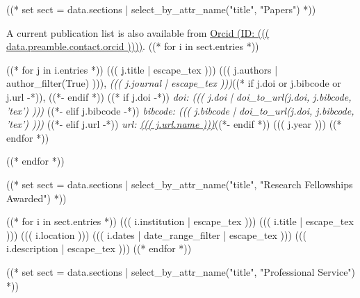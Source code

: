 \documentclass[10pt, letterpaper]{awesome-cv}
\begin{document}
((* set  sect = data.sections | select_by_attr_name("title", "Papers") *))

A current publication list is also available from 
\href{https://orcid.org/((( data.preamble.contact.orcid )))}
     {Orcid (ID: ((( data.preamble.contact.orcid ))))}.
((* for i in sect.entries *))
\begin{cvhonors}
  ((* for j in i.entries *))
  \cvhonor
    {((( j.title | escape_tex )))}
    {((( j.authors | author_filter(True) ))),
     {\slshape\color{awesome} ((( j.journal | escape_tex )))}((* if j.doi or j.bibcode or j.url -*)), ((*-  endif *))
     ((* if j.doi -*))
     {\slshape\color{graytext} doi: ((( j.doi | doi_to_url(j.doi, j.bibcode, 'tex') )))}
     ((*- elif j.bibcode -*))
     {\slshape\color{graytext} bibcode: ((( j.bibcode | doi_to_url(j.doi, j.bibcode, 'tex') )))}
     ((*- elif j.url -*))
     {\slshape\color{graytext} url: \href{((( j.url.link )))}{((( j.url.name )))}}((*- endif *))}
    {}
    {((( j.year )))}
  ((* endfor *))
\end{cvhonors}
((* endfor *))

((* set sect = data.sections | select_by_attr_name("title", "Research Fellowships Awarded") *))
\begin{cventries}
((* for i in sect.entries *))
\cventry
  {((( i.institution | escape_tex )))}
  {((( i.title | escape_tex )))}
  {((( i.location )))}
  {((( i.dates | date_range_filter | escape_tex )))}
  {((( i.description | escape_tex )))}
((* endfor *))
\end{cventries}

((* set sect = data.sections | select_by_attr_name("title", "Professional Service") *))
\end{document}
